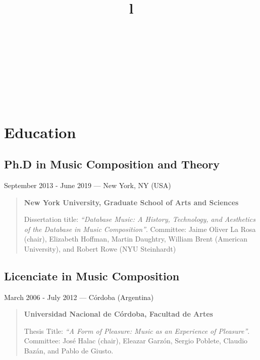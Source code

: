 \documentclass[12pt,overlapped]{res}%
\begin{document}
%
\begin{resume}
%
\address{+1 614 440 7529\\camarahalac.1@osu.edu\\https://fdch.github.io}%
\address{349C Sullivant Hall,\\1813 North High Street,\\Columbus, OH 43210}%
\begin{format}\\
\\
\title{l}\\
\\
\\
\body
\end{format}%
\section{Education}%
%
%
%
\subsection{Ph.D in Music Composition and Theory}%
September  2013 - June  2019 --- New York, NY (USA)%
\begin{quote}
\par
\textbf{New York University, Graduate School of Arts and Sciences}
\par Dissertation title: \textit{``Database Music: A History, Technology, and Aesthetics of the Database in Music Composition''}.  Committee: Jaime Oliver La Rosa (chair), Elizabeth Hoffman, Martin Daughtry, William Brent (American University), and Robert Rowe (NYU Steinhardt) 
\end{quote}%
%
%
%
\subsection{Licenciate in Music Composition}%
March  2006 - July  2012 --- Córdoba (Argentina)%
\begin{quote}
\par
\textbf{Universidad Nacional de Córdoba, Facultad de Artes}
\par
Thesis Title: \textit{``A Form of Pleasure: Music as an Experience of Pleasure''}. Committee: José Halac (chair), Eleazar Garzón, Sergio Poblete, Claudio Bazán, and Pablo de Giusto. 
\end{quote}%

\end{resume}
\end{document}
